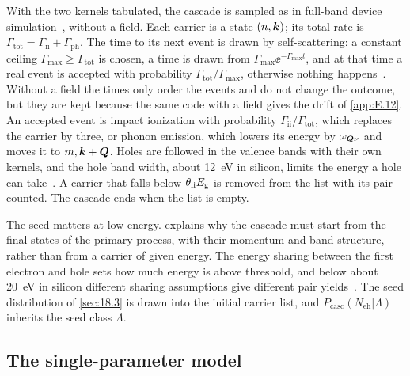 With the two kernels tabulated, the cascade is sampled as in full-band device simulation~\cite{fischetti1988monte}, without a field. Each carrier is a state $(n, \bm{k})$; its total rate is $\varGamma_{\mathrm{tot}} = \varGamma_{\mathrm{ii}} + \varGamma_{\mathrm{ph}}$. The time to its next event is drawn by self-scattering: a constant ceiling $\varGamma_{\mathrm{max}} \ge \varGamma_{\mathrm{tot}}$ is chosen, a time is drawn from $\varGamma_{\mathrm{max}}\ee^{-\varGamma_{\mathrm{max}}t}$, and at that time a real event is accepted with probability $\varGamma_{\mathrm{tot}}/\varGamma_{\mathrm{max}}$, otherwise nothing happens~\cite{jacoboni1983monte}. Without a field the times only order the events and do not change the outcome, but they are kept because the same code with a field gives the drift of \cref{app:E.12}. An accepted event is impact ionization with probability $\varGamma_{\mathrm{ii}}/\varGamma_{\mathrm{tot}}$, which replaces the carrier by three, or phonon emission, which lowers its energy by $\omega_{\bm{Q}\nu}$ and moves it to $m, \bm{k}+\bm{Q}$. Holes are followed in the valence bands with their own kernels, and the hole band width, about \SI{12}{eV} in silicon, limits the energy a hole can take~\cite[Sect.~II\,A]{ramanathan2020ionization}. A carrier that falls below $\theta_{\mathrm{ii}}E_{\mathrm{g}}$ is removed from the list with its pair counted. The cascade ends when the list is empty.

The seed matters at low energy.  explains why the cascade must start from the final states of the primary process, with their momentum and band structure, rather than from a carrier of given energy. The energy sharing between the first electron and hole sets how much energy is above threshold, and below about \SI{20}{eV} in silicon different sharing assumptions give different pair yields~\cite[Sect.~IV\,B]{ramanathan2020ionization}. The seed distribution of \cref{sec:18.3} is drawn into the initial carrier list, and $P_{\mathrm{casc}}(N_{\mathrm{eh}}|\Lambda)$ inherits the seed class $\Lambda$.

\subsection{The single-parameter model}

